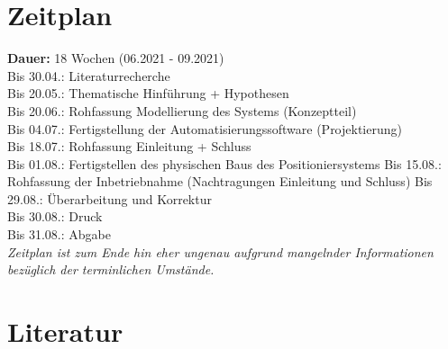 \documentclass[12pt, a4paper, twoside]{article} %
\begin{document}
\section{Zeitplan}
\textbf{Dauer:} 18 Wochen (06.2021 - 09.2021)\\
Bis 30.04.: Literaturrecherche\\
Bis 20.05.: Thematische Hinführung + Hypothesen\\
Bis 20.06.: Rohfassung Modellierung des Systems (Konzeptteil)\\
Bis 04.07.: Fertigstellung der Automatisierungssoftware (Projektierung)\\
Bis 18.07.: Rohfassung Einleitung + Schluss\\
Bis 01.08.: Fertigstellen des physischen Baus des Positioniersystems
Bis 15.08.: Rohfassung der Inbetriebnahme (Nachtragungen Einleitung und Schluss)
Bis 29.08.: Überarbeitung und Korrektur\\
Bis 30.08.: Druck \\
Bis 31.08.: Abgabe\\
\textit{Zeitplan ist zum Ende hin eher ungenau aufgrund mangelnder Informationen bezüglich der terminlichen Umstände.}

\newpage
\section*{Literatur}

\nocite{Laplante2014}
\nocite{Bindel2017}

\printbibliography[
	heading=subbibintoc,
	type=book,
	title={Bücher}
]
	


\end{document}
